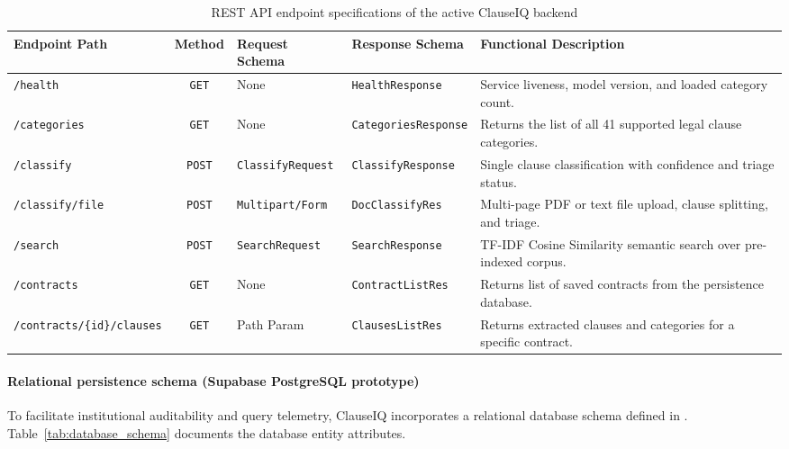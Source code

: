 \begin{table}[htbp]
\centering
\footnotesize
\setlength{\tabcolsep}{3.5pt}
\begin{tabular}{>{\raggedright\arraybackslash}p{3.2cm} c >{\raggedright\arraybackslash}p{2.6cm} >{\raggedright\arraybackslash}p{2.6cm} >{\raggedright\arraybackslash}p{4.2cm}}
\toprule
\textbf{Endpoint Path} & \textbf{Method} & \textbf{Request Schema} & \textbf{Response Schema} & \textbf{Functional Description} \\
\midrule
\texttt{/health} & \texttt{GET} & None & \texttt{HealthResponse} & Service liveness, model version, and loaded category count. \\
\addlinespace
\texttt{/categories} & \texttt{GET} & None & \texttt{CategoriesResponse} & Returns the list of all 41 supported legal clause categories. \\
\addlinespace
\texttt{/classify} & \texttt{POST} & \texttt{ClassifyRequest} & \texttt{ClassifyResponse} & Single clause classification with confidence and triage status. \\
\addlinespace
\texttt{/classify/file} & \texttt{POST} & \texttt{Multipart/Form} & \texttt{DocClassifyRes} & Multi-page PDF or text file upload, clause splitting, and triage. \\
\addlinespace
\texttt{/search} & \texttt{POST} & \texttt{SearchRequest} & \texttt{SearchResponse} & TF-IDF Cosine Similarity semantic search over pre-indexed corpus. \\
\addlinespace
\texttt{/contracts} & \texttt{GET} & None & \texttt{ContractListRes} & Returns list of saved contracts from the persistence database. \\
\addlinespace
\texttt{/contracts/\{id\}/clauses} & \texttt{GET} & Path Param & \texttt{ClausesListRes} & Returns extracted clauses and categories for a specific contract. \\
\bottomrule
\end{tabular}
\caption{REST API endpoint specifications of the active ClauseIQ backend}\label{tab:api_endpoints}
\end{table}

\paragraph*{Relational persistence schema (Supabase PostgreSQL prototype)}
To facilitate institutional auditability and query telemetry, ClauseIQ incorporates a relational database schema defined in . Table~\ref{tab:database_schema} documents the database entity attributes.

